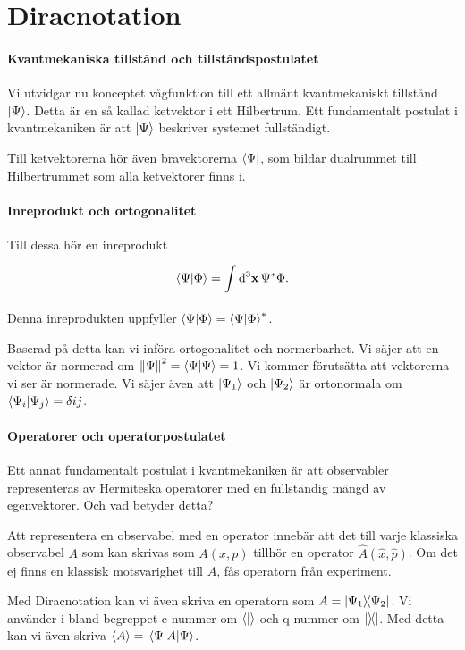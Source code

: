 \section{Diracnotation}

\paragraph{Kvantmekaniska tillstånd och tillståndspostulatet}
Vi utvidgar nu konceptet vågfunktion till ett allmänt kvantmekaniskt tillstånd $\ket{\Psi}$. Detta är en så kallad ketvektor i ett Hilbertrum. Ett fundamentalt postulat i kvantmekaniken är att $\ket{\Psi}$ beskriver systemet fullständigt.

Till ketvektorerna hör även bravektorerna $\bra{\Psi}$, som bildar dualrummet till Hilbertrummet som alla ketvektorer finns i.

\paragraph{Inreprodukt och ortogonalitet}
Till dessa hör en inreprodukt
\begin{align*}
	\braket{\Psi}{\Phi} = \int\limits_{}^{}\dd[3]{\vb{x}}\Psi^{*}\Phi.
\end{align*}
Denna inreprodukten uppfyller $\braket{\Psi}{\Phi} = \braket{\Psi}{\Phi}^{*}$.

Baserad på detta kan vi införa ortogonalitet och normerbarhet. Vi säjer att en vektor är normerad om $\norm{\Psi}^{2} = \braket{\Psi} = 1$. Vi kommer förutsätta att vektorerna vi ser är normerade. Vi säjer även att $\ket{\Psi_{1}}$ och $\ket{\Psi_{2}}$ är ortonormala om $\braket{\Psi_{i}}{\Psi_{j}} = \delta{ij}$.

\paragraph{Operatorer och operatorpostulatet}
Ett annat fundamentalt postulat i kvantmekaniken är att observabler representeras av Hermiteska operatorer med en fullständig mängd av egenvektorer. Och vad betyder detta?

Att representera en observabel med en operator innebär att det till varje klassiska observabel $A$ som kan skrivas som $A(x, p)$ tillhör en operator $\hat{A}(\hat{x}, \hat{p})$. Om det ej finns en klassisk motsvarighet till $A$, fås operatorn från experiment.

Med Diracnotation kan vi även skriva en operatorn som $A = \op{\Psi_{1}}{\Psi_{2}}$. Vi använder i bland begreppet c-nummer om $\braket{}$ och q-nummer om $\op{}{}$. Med detta kan vi även skriva $\expval{A} = \expval{A}{\Psi}$.

